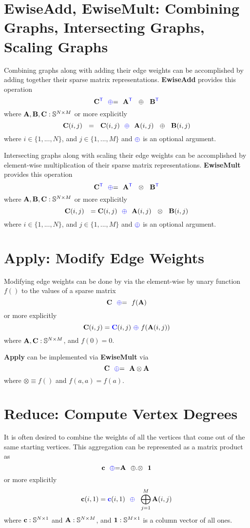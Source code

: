 \section{EwiseAdd, EwiseMult: Combining Graphs, Intersecting Graphs, Scaling Graphs}
  Combining graphs along with adding their edge weights can be accomplished by adding together their sparse matrix representations. {\bf EwiseAdd} provides this operation
$$
   {\bf C}^{\textcolor{blue}{\sf T}} ~~ {\textcolor{blue}{\oplus}}{=} ~~ {\bf A}^{\textcolor{blue}{\sf T}} ~~ \oplus ~~ {\bf B}^{\textcolor{blue}{\sf T}}
$$
where ${\bf A},{\bf B},{\bf C}: \mathbb{S}^{N \times M}$ or more explicitly 
$$
   {\bf C}(i,j) ~~ = ~~ {\bf C}(i,j) ~~ {\textcolor{blue}{\oplus}} ~~ {\bf A}(i,j) ~~ \oplus ~~{\bf B}(i,j)
$$
where $i \in \{1,...,N\}$, and $j \in \{1,...,M\}$ and ${\textcolor{blue}{\oplus}}$ is an optional argument. 

  Intersecting graphs along with scaling their edge weights can be accomplished by element-wise multiplication of their sparse matrix representations. {\bf EwiseMult} provides this operation
$$
   {\bf C}^{\textcolor{blue}{\sf T}} ~~ {\textcolor{blue}{\oplus}}{=} ~~ {\bf A}^{\textcolor{blue}{\sf T}} ~~ \otimes ~~ {\bf B}^{\textcolor{blue}{\sf T}}
$$
where ${\bf A},{\bf B},{\bf C}: \mathbb{S}^{N \times M}$ or more explicitly 
$$
   {\bf C}(i,j) ~~ = {\bf C}(i,j) ~~ {\textcolor{blue}{\oplus}} ~~ {\bf A}(i,j) ~~ \otimes ~~{\bf B}(i,j)
$$
where $i \in \{1,...,N\}$, and $j \in \{1,...,M\}$ and ${\textcolor{blue}{\oplus}}$ is an optional argument. 

\section{Apply: Modify Edge Weights}
  Modifying edge weights can be done by via the element-wise by unary function $f()$ to the values of a sparse matrix
$$
   {\bf C} ~~ {\textcolor{blue}{\oplus}}{=} ~~ f({\bf A})
$$
or more explicitly
$$
   {\bf C}(i,j) = {\textcolor{blue}{\bf C}}(i,j) ~ {\textcolor{blue}{\oplus}} ~f({\bf A}(i,j))
$$
where ${\bf A},{\bf C}: \mathbb{S}^{N \times M}$, and $f(0) = 0$.

  {\bf Apply} can be implemented via {\bf EwiseMult} via
$$
   {\bf C} ~~ {\textcolor{blue}{\oplus}}{=} ~~ {\bf A} \otimes {\bf A}
$$
where $\otimes \equiv f()$ and $f(a,a) = f(a)$.

\section{Reduce: Compute Vertex Degrees}
  It is often desired to combine the weights of all the vertices that come out of the same starting vertices.  This aggregation can be represented as a matrix product as
$$
   {\bf c} ~~ {\textcolor{blue}{\oplus}}{=} {\bf A} ~~ {\oplus}.{\otimes} ~~{\bf 1}
$$
or more explicitly
$$
   {\bf c}(i,1) = {\textcolor{blue}{\bf c}}(i,1) ~~ {\textcolor{blue}{\oplus}} ~~ \bigoplus_{j=1}^M {\bf A}(i,j)
$$
where ${\bf c}: \mathbb{S}^{N \times 1}$ and ${\bf A}: \mathbb{S}^{N \times M}$, and ${\bf 1}: \mathbb{S}^{M \times 1}$ is a column vector of all ones.


